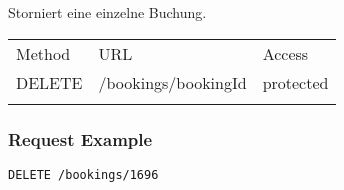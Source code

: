 Storniert eine einzelne Buchung.

\begin{longtable}[c]{@{}lll@{}}
\toprule\addlinespace
Method & URL & Access
\\\addlinespace
\midrule\endhead
DELETE & /bookings/bookingId & protected
\\\addlinespace
\bottomrule
\end{longtable}

\subsubsection{Request Example}\label{request-example}

\begin{verbatim}
DELETE /bookings/1696
\end{verbatim}

